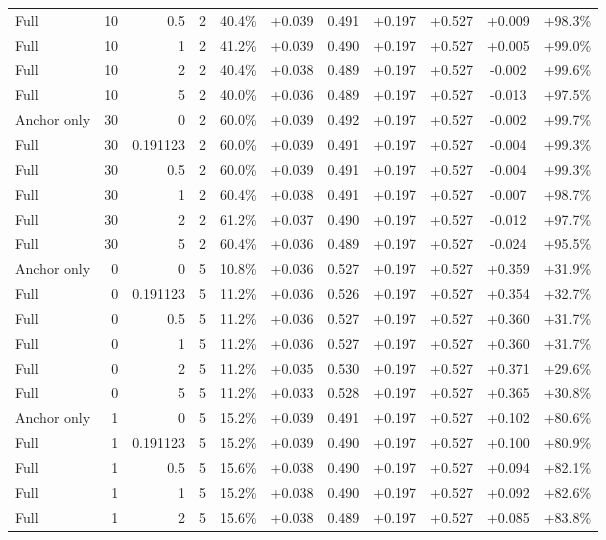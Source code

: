 \begin{table}[htbp]
\begin{tabular}{lrrrccccccc}
Full & 10 & 0.5 & 2 & 40.4\% & +0.039 & 0.491 & +0.197 & +0.527 & +0.009 & +98.3\% \\
Full & 10 & 1 & 2 & 41.2\% & +0.039 & 0.490 & +0.197 & +0.527 & +0.005 & +99.0\% \\
Full & 10 & 2 & 2 & 40.4\% & +0.038 & 0.489 & +0.197 & +0.527 & -0.002 & +99.6\% \\
Full & 10 & 5 & 2 & 40.0\% & +0.036 & 0.489 & +0.197 & +0.527 & -0.013 & +97.5\% \\
Anchor only & 30 & 0 & 2 & 60.0\% & +0.039 & 0.492 & +0.197 & +0.527 & -0.002 & +99.7\% \\
Full & 30 & 0.191123 & 2 & 60.0\% & +0.039 & 0.491 & +0.197 & +0.527 & -0.004 & +99.3\% \\
Full & 30 & 0.5 & 2 & 60.0\% & +0.039 & 0.491 & +0.197 & +0.527 & -0.004 & +99.3\% \\
Full & 30 & 1 & 2 & 60.4\% & +0.038 & 0.491 & +0.197 & +0.527 & -0.007 & +98.7\% \\
Full & 30 & 2 & 2 & 61.2\% & +0.037 & 0.490 & +0.197 & +0.527 & -0.012 & +97.7\% \\
Full & 30 & 5 & 2 & 60.4\% & +0.036 & 0.489 & +0.197 & +0.527 & -0.024 & +95.5\% \\
Anchor only & 0 & 0 & 5 & 10.8\% & +0.036 & 0.527 & +0.197 & +0.527 & +0.359 & +31.9\% \\
Full & 0 & 0.191123 & 5 & 11.2\% & +0.036 & 0.526 & +0.197 & +0.527 & +0.354 & +32.7\% \\
Full & 0 & 0.5 & 5 & 11.2\% & +0.036 & 0.527 & +0.197 & +0.527 & +0.360 & +31.7\% \\
Full & 0 & 1 & 5 & 11.2\% & +0.036 & 0.527 & +0.197 & +0.527 & +0.360 & +31.7\% \\
Full & 0 & 2 & 5 & 11.2\% & +0.035 & 0.530 & +0.197 & +0.527 & +0.371 & +29.6\% \\
Full & 0 & 5 & 5 & 11.2\% & +0.033 & 0.528 & +0.197 & +0.527 & +0.365 & +30.8\% \\
Anchor only & 1 & 0 & 5 & 15.2\% & +0.039 & 0.491 & +0.197 & +0.527 & +0.102 & +80.6\% \\
Full & 1 & 0.191123 & 5 & 15.2\% & +0.039 & 0.490 & +0.197 & +0.527 & +0.100 & +80.9\% \\
Full & 1 & 0.5 & 5 & 15.6\% & +0.038 & 0.490 & +0.197 & +0.527 & +0.094 & +82.1\% \\
Full & 1 & 1 & 5 & 15.2\% & +0.038 & 0.490 & +0.197 & +0.527 & +0.092 & +82.6\% \\
Full & 1 & 2 & 5 & 15.6\% & +0.038 & 0.489 & +0.197 & +0.527 & +0.085 & +83.8\% \\

\end{tabular}
\end{table}
